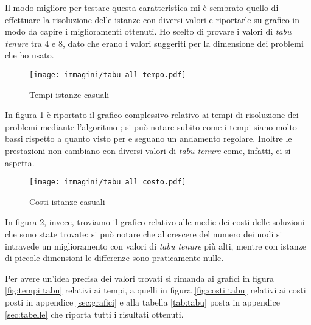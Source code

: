 Il modo migliore per testare questa caratteristica mi è sembrato quello di effettuare la risoluzione delle istanze con diversi valori e riportarle su grafico in modo da capire i miglioramenti ottenuti.
Ho scelto di provare i valori di \emph{tabu tenure} tra $4$ e $8$, dato che erano i valori suggeriti per la dimensione dei problemi che ho usato.

\begin{figure}[htb]
	\centering
	\texttt{[image: immagini/tabu\_all\_tempo.pdf]}
	\caption{Tempi istanze casuali - \tabu}
	\label{fig:all tempi tabu}
\end{figure}

In figura \ref{fig:all tempi tabu} è riportato il grafico complessivo relativo ai tempi di risoluzione dei problemi mediante l'algoritmo \tabu; si può notare subito come i tempi siano molto bassi rispetto a quanto visto per  e seguano un andamento regolare.
Inoltre le prestazioni non cambiano con diversi valori di \emph{tabu tenure} come, infatti, ci si aspetta.

\begin{figure}[htb]
	\centering
	\texttt{[image: immagini/tabu\_all\_costo.pdf]}
	\caption{Costi istanze casuali - \tabu}
	\label{fig:all costi tabu}
\end{figure}

In figura \ref{fig:all costi tabu}, invece, troviamo il grafico relativo alle medie dei costi delle soluzioni che sono state trovate: si può notare che al crescere del numero dei nodi si intravede un miglioramento con valori di \emph{tabu tenure} più alti, mentre con istanze di piccole dimensioni le differenze sono praticamente nulle.

Per avere un'idea precisa dei valori trovati si rimanda ai grafici in figura \ref{fig:tempi tabu} relativi ai tempi, a quelli in figura \ref{fig:costi tabu} relativi ai costi posti in appendice \ref{sec:grafici} e alla tabella \ref{tab:tabu} posta in appendice \ref{sec:tabelle} che riporta tutti i risultati ottenuti.